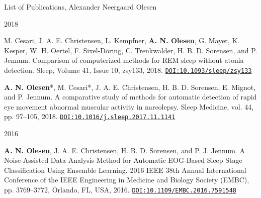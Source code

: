 \documentclass{resume} %
\begin{document}
\begin{rSection}{List of Publications, Alexander Neergaard Olesen}
\begin{rSubsection}{2018}{}{}{}
	    \item M. Cesari, J. A. E. Christensen, L. Kempfner, \textbf{A. N. Olesen}, G. Mayer, K. Kesper, W. H. Oertel, F. Sixel-Döring, C. Trenkwalder, H. B. D. Sorensen, and P. Jennum. Comparison of computerized methods for REM sleep without atonia detection. Sleep, Volume 41, Issue 10, zsy133, 2018. \href{https://doi.org/10.1093/sleep/zsy133}{\texttt{DOI:10.1093/sleep/zsy133}} \medskip
	    
	    \item \textbf{A. N. Olesen}\mbox{*}, M. Cesari\mbox{*}, J. A. E. Christensen, H. B. D. Sorensen, E. Mignot, and P. Jennum. A comparative study of methods for automatic detection of rapid eye movement abnormal muscular activity in narcolepsy. Sleep Medicine, vol. 44, pp. 97–105, 2018. \href{https://doi.org/10.1016/j.sleep.2017.11.1141}{\texttt{DOI:10.1016/j.sleep.2017.11.1141}}
	\end{rSubsection}
	
	\begin{rSubsection}{2016}{}{}{}
	    \item \textbf{A. N. Olesen}, J. A. E. Christensen, H. B. D. Sorensen, and P. J. Jennum. A Noise-Assisted Data Analysis Method for Automatic EOG-Based Sleep Stage Classification Using Ensemble Learning. 2016 IEEE 38th Annual International Conference of the IEEE Engineering in Medicine and Biology Society (EMBC), pp. 3769–3772, Orlando, FL, USA, 2016. \href{https://doi.org/10.1109/EMBC.2016.7591548}{\texttt{DOI:10.1109/EMBC.2016.7591548}}
	\end{rSubsection}
	
	
\end{rSection}











\end{document}
